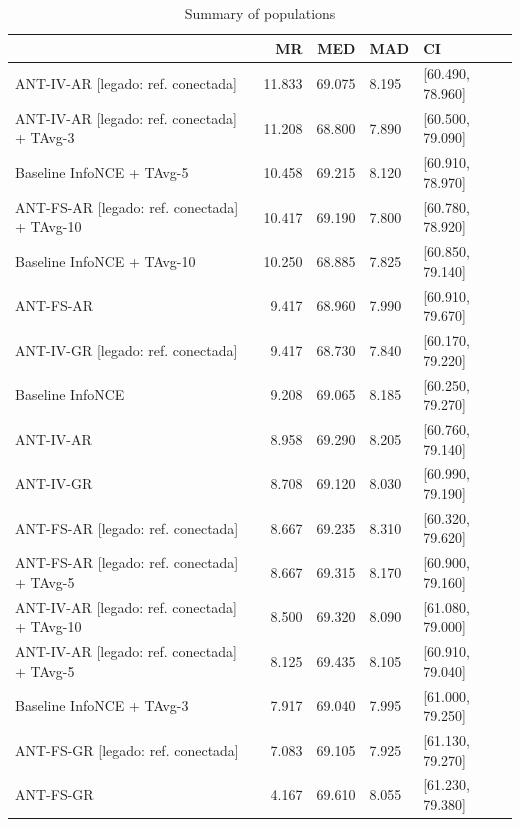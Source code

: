 \begin{table}[h]
\centering
\begin{tabular}{lrrll}
\toprule
 & MR & MED & MAD & CI \\
\midrule
ANT-IV-AR [legado: ref. conectada] & 11.833 & 69.075 & 8.195 & [60.490, 78.960] \\
ANT-IV-AR [legado: ref. conectada] + TAvg-3 & 11.208 & 68.800 & 7.890 & [60.500, 79.090] \\
Baseline InfoNCE + TAvg-5 & 10.458 & 69.215 & 8.120 & [60.910, 78.970] \\
ANT-FS-AR [legado: ref. conectada] + TAvg-10 & 10.417 & 69.190 & 7.800 & [60.780, 78.920] \\
Baseline InfoNCE + TAvg-10 & 10.250 & 68.885 & 7.825 & [60.850, 79.140] \\
ANT-FS-AR & 9.417 & 68.960 & 7.990 & [60.910, 79.670] \\
ANT-IV-GR [legado: ref. conectada] & 9.417 & 68.730 & 7.840 & [60.170, 79.220] \\
Baseline InfoNCE & 9.208 & 69.065 & 8.185 & [60.250, 79.270] \\
ANT-IV-AR & 8.958 & 69.290 & 8.205 & [60.760, 79.140] \\
ANT-IV-GR & 8.708 & 69.120 & 8.030 & [60.990, 79.190] \\
ANT-FS-AR [legado: ref. conectada] & 8.667 & 69.235 & 8.310 & [60.320, 79.620] \\
ANT-FS-AR [legado: ref. conectada] + TAvg-5 & 8.667 & 69.315 & 8.170 & [60.900, 79.160] \\
ANT-IV-AR [legado: ref. conectada] + TAvg-10 & 8.500 & 69.320 & 8.090 & [61.080, 79.000] \\
ANT-IV-AR [legado: ref. conectada] + TAvg-5 & 8.125 & 69.435 & 8.105 & [60.910, 79.040] \\
Baseline InfoNCE + TAvg-3 & 7.917 & 69.040 & 7.995 & [61.000, 79.250] \\
ANT-FS-GR [legado: ref. conectada] & 7.083 & 69.105 & 7.925 & [61.130, 79.270] \\
ANT-FS-GR & 4.167 & 69.610 & 8.055 & [61.230, 79.380] \\
\bottomrule
\end{tabular}
\caption{Summary of populations}
\label{tbl:stat_results}
\end{table}
